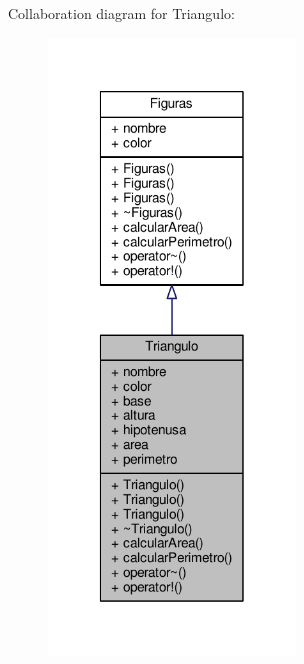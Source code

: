 Collaboration diagram for Triangulo\+:
\nopagebreak
\begin{figure}[H]
\begin{center}
\leavevmode
\includegraphics[width=186pt]{class_triangulo__coll__graph}
\end{center}
\end{figure}
